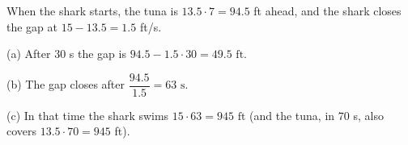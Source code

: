 When the shark starts, the tuna is $13.5\cdot7=94.5$ ft ahead, and the shark closes the gap at $15-13.5=1.5$ ft/s.

(a) After $30$ s the gap is $94.5-1.5\cdot30=\boxed{49.5\text{ ft}}$.

(b) The gap closes after $\dfrac{94.5}{1.5}=\boxed{63\text{ s}}$.

(c) In that time the shark swims $15\cdot63=\boxed{945\text{ ft}}$ (and the tuna, in $70$ s, also covers $13.5\cdot70=945$ ft).
